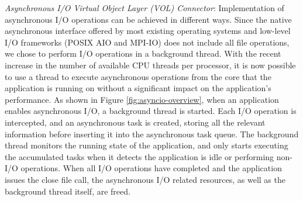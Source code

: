
\textit{Asynchronous I/O Virtual Object Layer (VOL) Connector}: Implementation of asynchronous I/O operations can be achieved in different ways. Since the native asynchronous interface offered by most existing operating systems and low-level I/O frameworks (POSIX AIO and MPI-IO) does not include all file operations, we chose to perform I/O operations in a background thread. With the recent increase in the number of available CPU threads per processor, it is now possible to use a thread to execute asynchronous operations from the core that the application is running on without a significant impact on the application's performance. As shown in Figure \ref{fig:asyncio-overview}, when an application enables asynchronous I/O, a background thread is started. Each I/O operation is intercepted, and an asynchronous task is created, storing all the relevant information before inserting it into the asynchronous task queue. The background thread monitors the running state of the application, and only starts executing the accumulated tasks when it detects the application is idle or performing non-I/O operations. When all I/O operations have completed and the application issues the close file call, the asynchronous I/O related resources, as well as the background thread itself, are freed.


